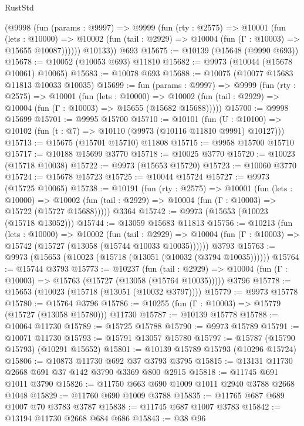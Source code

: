 \begin{lexlean}{RustStd}
\begin{coremodule}
        (@9998
          (fun (params : @9997) =>
          @9999
            (fun (rty : @2575) =>
            @10001
              (fun (lets : @10000) =>
              @10002 (fun (tail : @2929) => @10004 (fun (Γ : @10003) => @15655 @10087))))))
        @10133))
    @693
@15675 := @10139 (@15648 (@9990 @693))
@15678 := @10052 (@10053 @693) @11810
@15682 := @9973 (@10044 (@15678 @10061) @10065)
@15683 := @10078 @693
@15688 := @10075 (@10077 @15683 @11813 @10033 @10035)
@15699 := fun (params : @9997) =>
  @9999
    (fun (rty : @2575) =>
    @10001
      (fun (lets : @10000) =>
      @10002 (fun (tail : @2929) => @10004 (fun (Γ : @10003) => @15655 (@15682 @15688)))))
@15700 := @9998 @15699
@15701 := @9995 @15700
@15710 := @10101
    (fun (U : @10100) => @10102 (fun (t : @7) => @10110 (@9973 (@10116 @11810 @9991) @10127)))
@15713 := @15675 (@15701 @15710) @11808
@15715 := @9958 @15700 @15710
@15717 := @10188 @15699 @3770
@15718 := @10025 @3770
@15720 := @10023 (@15718 @10038)
@15722 := @9973 (@15653 @15720)
@15723 := @10060 @3770
@15724 := @15678 @15723
@15725 := @10044 @15724
@15727 := @9973 (@15725 @10065)
@15738 := @10191
    (fun (rty : @2575) =>
    @10001
      (fun (lets : @10000) =>
      @10002 (fun (tail : @2929) => @10004 (fun (Γ : @10003) => @15722 (@15727 @15688)))))
    @3364
@15742 := @9973 (@15653 (@10023 (@15718 @13052)))
@15744 := @13059 @15683 @11813
@15756 := @10213
    (fun (lets : @10000) =>
    @10002
      (fun (tail : @2929) =>
      @10004 (fun (Γ : @10003) => @15742 (@15727 (@13058 (@15744 @10033 @10035))))))
    @3793
@15763 := @9973 (@15653 (@10023 (@15718 (@13051 (@10032 (@3794 @10035))))))
@15764 := @15744 @3793
@15773 := @10237
    (fun (tail : @2929) => @10004 (fun (Γ : @10003) => @15763 (@15727 (@13058 (@15764 @10035)))))
    @3796
@15778 := @15653 (@10023 (@15718 (@13051 (@10032 @3797))))
@15779 := @9973 @15778
@15780 := @15764 @3796
@15786 := @10255 (fun (Γ : @10003) => @15779 (@15727 (@13058 @15780))) @11730
@15787 := @10139 @15778
@15788 := @10064 @11730
@15789 := @15725 @15788
@15790 := @9973 @15789
@15791 := @10071 @11730
@15793 := @15791 @13057 @15780
@15797 := @15787 (@15790 @15793) (@10291 @15652)
@15801 := @10139 @15789 @15793 (@10296 @15724)
@15806 := @10873 @11730 @692 @37 @3793 @3795
@15815 := @13131 @11730 @2668 @691 @37 @142 @3790 @3369 @800 @2915
@15818 := @11745 @691 @1011 @3790
@15826 := @11750 @663 @690 @1009 @1011 @2940 @3788 @2668 @1048
@15829 := @11760 @690 @1009 @3788
@15835 := @11765 @687 @689 @1007 @70 @3783 @3787
@15838 := @11745 @687 @1007 @3783
@15842 := @13194 @11730 @2668 @684 @686
@15843 := @38 @96

\end{coremodule}
\end{lexlean}

